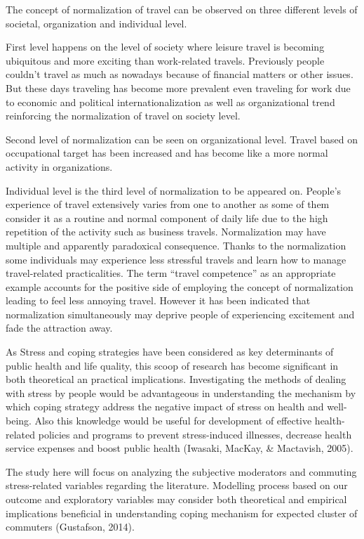 \documentclass[
11pt, %
oneside, %
english, %
singlespacing, %
]{macthesis} %
\begin{document}
The concept of normalization of travel can be observed on three different levels of societal, organization and individual level.

First level happens on the level of society where leisure travel is becoming ubiquitous and more exciting than work-related travels. Previously people couldn't travel as much as nowadays because of financial matters or other issues. But these days traveling has become more prevalent even traveling for work due to economic and political internationalization as well as organizational trend reinforcing the normalization of travel on society level.

Second level of normalization can be seen on organizational level. Travel based on occupational target has been increased and has become like a more normal activity in organizations.

Individual level is the third level of normalization to be appeared on. People's experience of travel extensively varies from one to another as some of them consider it as a routine and normal component of daily life due to the high repetition of the activity such as business travels. Normalization may have multiple and apparently paradoxical consequence. Thanks to the normalization some individuals may experience less stressful travels and learn how to manage travel-related practicalities. The term ``travel competence'' as an appropriate example accounts for the positive side of employing the concept of normalization leading to feel less annoying travel. However it has been indicated that normalization simultaneously may deprive people of experiencing excitement and fade the attraction away.

As Stress and coping strategies have been considered as key determinants of public health and life quality, this scoop of research has become significant in both theoretical an practical implications. Investigating the methods of dealing with stress by people would be advantageous in understanding the mechanism by which coping strategy address the negative impact of stress on health and well-being. Also this knowledge would be useful for development of effective health-related policies and programs to prevent stress-induced illnesses, decrease health service expenses and boost public health (Iwasaki, MacKay, \& Mactavish, 2005).

The study here will focus on analyzing the subjective moderators and commuting stress-related variables regarding the literature. Modelling process based on our outcome and exploratory variables may consider both theoretical and empirical implications beneficial in understanding coping mechanism for expected cluster of commuters (Gustafson, 2014).
\end{document}
